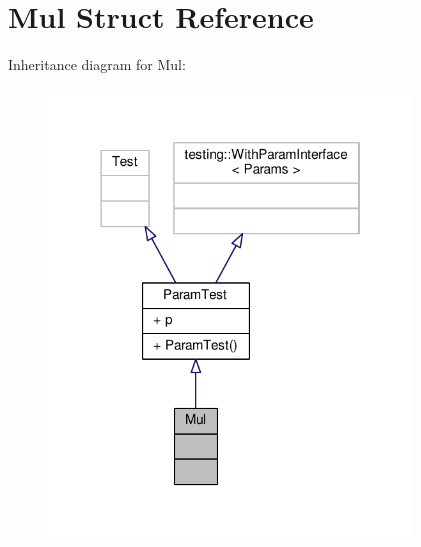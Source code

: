 \hypertarget{struct_mul}{}\section{Mul Struct Reference}
\label{struct_mul}


Inheritance diagram for Mul\+:
\nopagebreak
\begin{figure}[H]
\begin{center}
\leavevmode
\includegraphics[width=274pt]{struct_mul__inherit__graph}
\end{center}
\end{figure}


